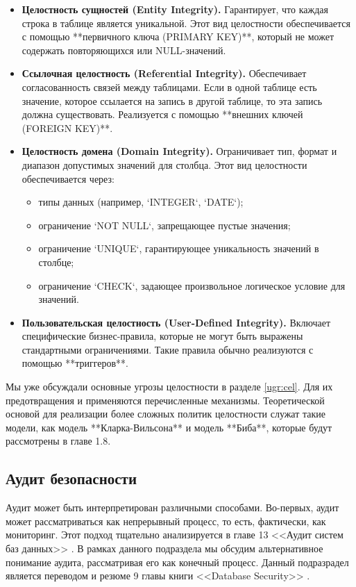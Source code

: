 \begin{itemize}
    \item \textbf{Целостность сущностей (Entity Integrity).} Гарантирует, что каждая строка в таблице является уникальной. Этот вид целостности обеспечивается с помощью **первичного ключа (PRIMARY KEY)**, который не может содержать повторяющихся или NULL-значений.
    
    \item \textbf{Ссылочная целостность (Referential Integrity).} Обеспечивает согласованность связей между таблицами. Если в одной таблице есть значение, которое ссылается на запись в другой таблице, то эта запись должна существовать. Реализуется с помощью **внешних ключей (FOREIGN KEY)**.
    
    \item \textbf{Целостность домена (Domain Integrity).} Ограничивает тип, формат и диапазон допустимых значений для столбца. Этот вид целостности обеспечивается через:
    \begin{itemize}
        \item типы данных (например, `INTEGER`, `DATE`);
        \item ограничение `NOT NULL`, запрещающее пустые значения;
        \item ограничение `UNIQUE`, гарантирующее уникальность значений в столбце;
        \item ограничение `CHECK`, задающее произвольное логическое условие для значений.
    \end{itemize}
    
    \item \textbf{Пользовательская целостность (User-Defined Integrity).} Включает специфические бизнес-правила, которые не могут быть выражены стандартными ограничениями. Такие правила обычно реализуются с помощью **триггеров**.
\end{itemize}

Мы уже обсуждали основные угрозы целостности в разделе \ref{ugr:cel}. Для их предотвращения и применяются перечисленные механизмы. Теоретической основой для реализации более сложных политик целостности служат такие модели, как модель **Кларка-Вильсона** и модель **Биба**, которые будут рассмотрены в главе 1.8.

\subsection{Аудит безопасности}

Аудит может быть интерпретирован различными способами. Во-первых, аудит может рассматриваться как непрерывный процесс, то есть, фактически, как мониторинг. Этот подход тщательно анализируется в главе 13 <<Аудит систем баз данных>> \autocite{Smirnov2007}.
В рамках данного подраздела мы обсудим альтернативное понимание аудита, рассматривая его как конечный процесс. Данный подразрадел является переводом и резюме 9 главы книги <<Database Security>> \autocite{DatabaseSecurity}.


